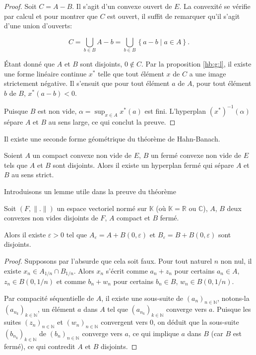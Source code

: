 \begin{proof}
  Soit $C = A - B $. Il s'agit d'un convexe ouvert de $E$. La convexité
  se vérifie par calcul et pour montrer que $C$ est ouvert,
  il suffit de remarquer qu'il s'agit d'une union d'ouverts:

  $$ C = \bigcup_{b\in B} A - b =
  \bigcup_{b\in B} \left\{a - b \mid a\in A\right\}.$$

  \'{E}tant donné que $A$ et $B$ sont disjoints, $0\notin C$.
  Par la proposition \ref{hb:g:l}, il existe une forme linéaire
  continue $x^*$ telle que tout élément $x$ de $C$ a une image
  strictement négative. Il s'ensuit que pour tout élément $a$ de
  $A$, pour tout élément $b$ de $B$, $x^*(a - b) < 0$.

  Puisque $B$ est non vide, $\alpha = \sup_{x\in A}x^*(a)$ est fini. L'hyperplan
  $(x^*)^{-1}(\alpha)$ sépare $A$ et $B$ au sens large, ce qui conclut la preuve.
\end{proof}

Il existe une seconde forme géométrique du théorème de Hahn-Banach.

\begin{thm} \label{hb:g2}
  Soient $A$ un compact convexe non vide de $E$, $B$ un fermé convexe non vide
  de $E$ tels que $A$ et $B$ sont disjoints. Alors il existe un hyperplan
  fermé qui sépare $A$ et $B$ au sens strict.
\end{thm}

Introduisons un lemme utile dans la preuve du théorème

\begin{lem}\label{hb:g:l2}
  Soit $(F, \|.\|)$ un espace vectoriel normé sur $\mathbb{K}$ (où
  $\mathbb{K}= \mathbb{R}$ ou $\mathbb{C}$), $A$, $B$ deux convexes
  non vides disjoints de $F$, $A$ compact et $B$ fermé.

  Alors il existe $\varepsilon > 0$ tel que $A_\varepsilon =
  A + B(0, \varepsilon)$  et $B_\varepsilon = B
  + B(0, \varepsilon)$ sont disjoints.
\end{lem}
\begin{proof}
  Supposons par l'absurde que cela soit faux. Pour tout naturel $n$ non
  nul, il existe $x_n\in A_{1/n}\cap B_{1/n}$. Alors $x_n$ s'écrit comme
  $a_n + z_n$ pour certains $a_n\in A$, $z_n\in B(0, 1/n)$ et comme
  $b_n + w_n$ pour certains $b_n\in B$, $w_n\in B(0, 1/n)$.

  Par compacité séquentielle de $A$, il existe une sous-suite de
  $(a_n)_{n\in\mathbb{N}}$, notons-la $(a_{n_k})_{k\in\mathbb{N}}$, un élément
  $a$ dans $A$ tel que   $(a_{n_k})_{k\in\mathbb{N}}$ converge
  vers $a$. Puisque les suites $(z_n)_{n\in\mathbb{N}}$ et
  $(w_n)_{n\in\mathbb{N}}$ convergent vers $0$, on déduit que
  la sous-suite  $(b_{n_k})_{k\in\mathbb{N}}$ de
  $(b_{n})_{n\in\mathbb{N}}$ converge vers $a$, ce qui implique $a$
  dans $B$ (car $B$ est fermé), ce qui contredit $A$ et $B$ disjoints.
\end{proof}

